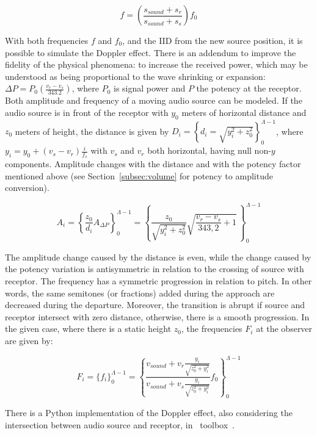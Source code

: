 \begin{equation}\label{eq:fDoppler}
    f=\left(\frac{s_{sound}+s_r}{s_{sound}+s_s}\right)f_0
\end{equation}

With both frequencies $f$ and $f_0$, and the IID from the new source
position, it is possible to simulate the Doppler effect. There is an addendum to improve the fidelity of the physical phenomena: to increase the received power, which may be understood as being proportional to the wave shrinking or expansion: $\Delta P=P_0\left(\frac{v_r-v_s}{343.2}\right)$,
 where $P_0$ is signal power and $P$ the potency at the receptor. Both amplitude and frequency of a moving audio source can be modeled. If the audio source is in front of the receptor with $y_0$ meters of horizontal distance and $z_0$ meters of height, the distance is given by
$D_i=\left\{ d_i=\sqrt{ y_{i}^{2}+z_{0}^{2} } \right\}_0^{\Lambda-1}$,
where $y_i=y_0+(v_s-v_r)\frac{i}{f_s}$ with $v_s$ and $v_r$ both
horizontal, having null non-$y$ components. Amplitude changes with the distance and with the potency factor mentioned above (see Section~\ref{subsec:volume} for potency to amplitude conversion).

\begin{equation}\label{eq:aDoppler}
    A_i=\left\{ \frac{z_0}{d_i}A_{\Delta P}\right\}_0^{\Lambda-1} = \left\{ \frac{z_0}{\sqrt{y_i^2+z_0^2}} \sqrt{\frac{v_r-v_s}{343,2}+1}  \,\right\}_0^{\Lambda-1}
\end{equation}

The amplitude change caused by the distance is even, while the change caused by the potency variation is antisymmetric in
relation to the crossing of source with receptor. The frequency has a symmetric progression in relation to pitch. In other words, the same semitones (or fractions) added during the approach are decreased during the departure. Moreover, the transition is abrupt if source and receptor intersect with zero distance, otherwise, there is a smooth progression.
In the given case, where there is a static height $z_0$, the frequencies $F_i$ at the observer are given by:

\begin{equation}\label{eq:ffDoppler}
    F_i=\{f_i\}_0^{\Lambda-1}=\left\{\frac{v_{sound} + v_r\frac{y_i}{\sqrt{z_0^2+y_i^2}}}{v_{sound}+v_s\frac{y_i}{\sqrt{z_0^2+y_i^2}}}f_0\right\}_0^{\Lambda-1}
\end{equation}

There is a Python implementation of the Doppler effect, also considering the intersection between audio source and receptor, in \massa\ toolbox~\cite{MASSA}.

